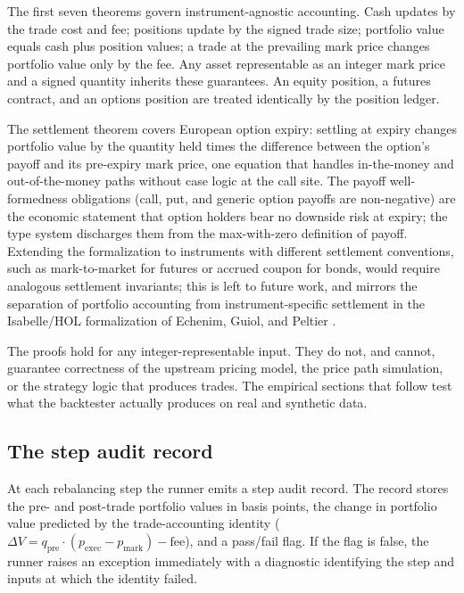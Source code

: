 \documentclass[
  11pt,
  letterpaper,
  DIV=12,
  numbers=noendperiod]{scrartcl}
\numberwithin{equation}{section}
\numberwithin{figure}{section}
\numberwithin{table}{section}
\begin{document}
The first seven theorems govern instrument-agnostic accounting. Cash
updates by the trade cost and fee; positions update by the signed trade
size; portfolio value equals cash plus position values; a trade at the
prevailing mark price changes portfolio value only by the fee. Any asset
representable as an integer mark price and a signed quantity inherits
these guarantees. An equity position, a futures contract, and an options
position are treated identically by the position ledger.

The settlement theorem covers European option expiry: settling at expiry
changes portfolio value by the quantity held times the difference
between the option's payoff and its pre-expiry mark price, one equation
that handles in-the-money and out-of-the-money paths without case logic
at the call site. The payoff well-formedness obligations (call, put, and
generic option payoffs are non-negative) are the economic statement that
option holders bear no downside risk at expiry; the type system
discharges them from the max-with-zero definition of payoff. Extending
the formalization to instruments with different settlement conventions,
such as mark-to-market for futures or accrued coupon for bonds, would
require analogous settlement invariants; this is left to future work,
and mirrors the separation of portfolio accounting from
instrument-specific settlement in the Isabelle/HOL formalization of
Echenim, Guiol, and Peltier .

The proofs hold for any integer-representable input. They do not, and
cannot, guarantee correctness of the upstream pricing model, the price
path simulation, or the strategy logic that produces trades. The
empirical sections that follow test what the backtester actually
produces on real and synthetic data.

\subsection{The step audit record}\label{sec-ledger-audit}

At each rebalancing step the runner emits a step audit record. The
record stores the pre- and post-trade portfolio values in basis points,
the change in portfolio value predicted by the trade-accounting identity
(\(\Delta V = q_{\text{pre}} \cdot (p_{\text{exec}} - p_{\text{mark}}) -
\text{fee}\)), and a pass/fail flag. If the flag is false, the runner
raises an exception immediately with a diagnostic identifying the step
and inputs at which the identity failed.
\end{document}
